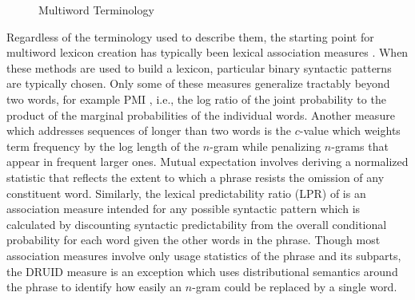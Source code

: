 \documentclass[11pt,letterpaper]{article}
\begin{document}
\begin{figure}[!t]
\caption{Multiword Terminology}
\label{fig:terminology}
\end{figure}



Regardless of the terminology used to describe them, the starting point for multiword lexicon creation has typically been lexical association measures \cite{Church90,Dunning93,Schone01,Evert04,Pecina10,DeAraujo11,Kulkarni11,Ramisch14}. When these methods are used to build a lexicon, particular binary syntactic patterns are typically chosen. Only some of these measures generalize tractably beyond two words, for example PMI \cite{Church90}, i.e., the log ratio of the joint probability to the product of the marginal probabilities of the individual words. Another measure which addresses sequences of longer than two words is the $c$-value \cite{Frantzi00} which weights term frequency by the log length of the $n$-gram while penalizing $n$-grams that appear in frequent larger ones. Mutual expectation \cite{Dias99} involves deriving a normalized statistic that reflects the extent to which a phrase resists the omission of any constituent word. Similarly, the lexical predictability ratio (LPR) of  is an association measure intended for any possible syntactic pattern which is calculated by discounting syntactic predictability from the overall conditional probability for each word given the other words in the phrase. Though most association measures involve only usage statistics of the phrase and its subparts, the DRUID measure \cite{Riedl15} is an exception which uses distributional semantics around the phrase to identify how easily an $n$-gram could be replaced by a single word.
\end{document}

